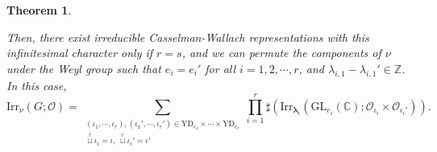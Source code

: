 \documentclass[12pt, a4paper]{amsart}
\numberwithin{equation}{section}
\newtheorem{thm}{Theorem}[section]
\newcommand{\blam}{{\boldsymbol{\lambda}}}
\newcommand{\BC}{{\mathbb {C}}}
\newcommand{\BZ}{{\mathbb {Z}}}
\newcommand{\CO}{{\mathcal {O}}}
\newcommand{\GL}{{\mathrm{GL}}}
\newcommand{\Irr}{{\mathrm{Irr}}}
\begin{document}
\begin{thm}
\begin{enumerate}
        Then, there exist irreducible Casselman-Wallach representations with this infinitesimal character only if $r = s$, and we can permute the components of $\nu$ under the Weyl group such that $e_i = e_i'$ for all $i = 1, 2, \cdots, r$, and $\lambda_{i,1} - \lambda_{i,1}' \in \BZ$. In this case, 
        \begin{equation}
            \Irr_{\nu}(G;\CO) = \sum_{\substack{(\iota_1,\cdots,\iota_r), (\iota_1',\cdots,\iota_r') \in \mathrm{YD}_{e_1} \times \cdots \times \mathrm{YD}_{e_r}\\ \mathop{\sqcup}\limits^r \iota_i = \iota, \ \mathop{\sqcup}\limits^r \iota_i' = \iota' }} \prod_{i=1}^{r} \sharp(\Irr_{\blam_i}(\GL_{e_i}(\BC);\CO_{\iota_i} \times \CO_{\iota_i'})).
        \end{equation}

    \end{enumerate}


\end{thm}
\end{document}
